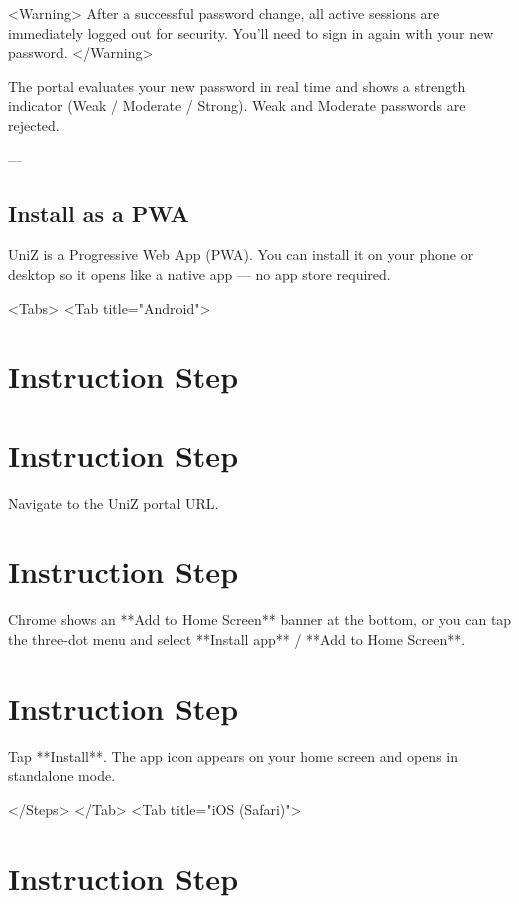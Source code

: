 <Warning>
  After a successful password change, all active sessions are immediately logged
  out for security. You'll need to sign in again with your new password.
</Warning>

The portal evaluates your new password in real time and shows a strength indicator (Weak / Moderate / Strong). Weak and Moderate passwords are rejected.

---

\subsection{Install as a PWA}

UniZ is a Progressive Web App (PWA). You can install it on your phone or desktop so it opens like a native app — no app store required.

<Tabs>
  <Tab title="Android">
    
\section{Instruction Step}

      
\section{Instruction Step}

        Navigate to the UniZ portal URL.
      
      
\section{Instruction Step}

        Chrome shows an **Add to Home Screen** banner at the bottom, or you can
        tap the three-dot menu and select **Install app** / **Add to Home
        Screen**.
      
      
\section{Instruction Step}

        Tap **Install**. The app icon appears on your home screen and opens in
        standalone mode.
      
    </Steps>
  </Tab>
  <Tab title="iOS (Safari)">
    
\section{Instruction Step}

